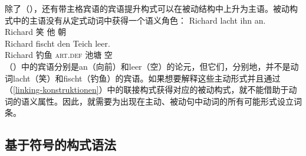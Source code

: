 除了（），还有带主格宾语的宾语提升构式可以在被动结构中上升为主语。被动构式中的主语没有从定式动词中获得一个语义角色：
\eal
\ex
\gll Richard lacht ihn an.\\
     Richard 笑 他 朝\\
\ex
\gll Richard fischt den Teich leer.\\
     Richard 钓鱼 \textsc{art}.\textsc{def} 池塘 空\\
\zl
 （）中的宾语分别是an（向前）和leer（空）的论元，但它们，分别地，并不是动词lacht（笑）和fischt（钓鱼）的宾语。如果想要解释这些主动形式并且通过 （\ref{linking-konstruktionen}）中的联接构式获得对应的被动构式，就不能借助于动词的语义属性。因此，就需要为出现在主动、被动句中动词的所有可能形式设立词条。

\subsection{基于符号的构式语法}
\label{sec-SbCxG}\label{sec-sbcg}\label{sec-SBCG}

